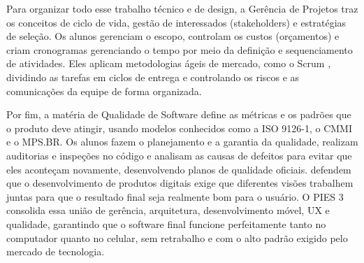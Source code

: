 Para organizar todo esse trabalho técnico e de design, a Gerência de Projetos
traz os conceitos de ciclo de vida, gestão de interessados (stakeholders) e
estratégias de seleção. Os alunos gerenciam o escopo, controlam os custos
(orçamentos) e criam cronogramas gerenciando o tempo por meio da definição e
sequenciamento de atividades. Eles aplicam metodologias ágeis de mercado, como
o Scrum \cite{sutherland2019scrum}, dividindo as tarefas em ciclos de entrega e
controlando os riscos e as comunicações da equipe de forma organizada.

Por fim, a matéria de Qualidade de Software define as métricas e os padrões que
o produto deve atingir, usando modelos conhecidos como a ISO 9126-1, o CMMI e o
MPS.BR. Os alunos fazem o planejamento e a garantia da qualidade, realizam
auditorias e inspeções no código e analisam as causas de defeitos para evitar
que eles aconteçam novamente, desenvolvendo planos de qualidade oficiais.
 defendem que o desenvolvimento de produtos
digitais exige que diferentes visões trabalhem juntas para que o resultado
final seja realmente bom para o usuário. O PIES 3 consolida essa união de
gerência, arquitetura, desenvolvimento móvel, UX e qualidade, garantindo que o
software final funcione perfeitamente tanto no computador quanto no celular,
sem retrabalho e com o alto padrão exigido pelo mercado de tecnologia.

